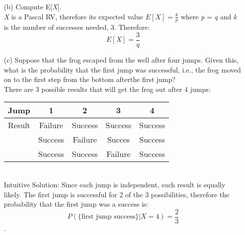 \documentclass{report}
\begin{document}
\begin{enumerate}
\begin{itemize}
\item[(b)] Compute E[\textit{X}]. \\ \newline
\textit{X} is a Pascal RV, therefore its expected value $ E[X] = \frac{k}{p} $ where \textit{p} = \textit{q} and \textit{k} is the number of successes needed, 3. Therefore: $$E[X] = \frac{3}{q}$$
\item[(c)] Suppose that the frog escaped from the well after four jumps. Given this, what is the probability that the first jump was successful, i.e., the frog moved on to the first step from the bottom afterthe first jump? \\ \newline
There are 3 possible results that will get the frog out after 4 jumps: \\ \newline
\begin{tabular}{c|cccc}
Jump & 1 & 2 & 3 & 4\\
\hline
Result & Failure & Success & Success & Success \\
 & Success & Failure & Succes & Success\\
& Success & Success & Failure & Success \\
\end{tabular} \\
\newline
Intuitive Solution: Since each jump is independent, each result is equally likely. The first jump is successful for 2 of the 3 possibilities, therefore the probability that the first jump was a success is: $$P(\{\text{first jump success}\}|X = 4) =  \frac{2}{3} $$.


\end{itemize}
\end{enumerate}
\end{document}

